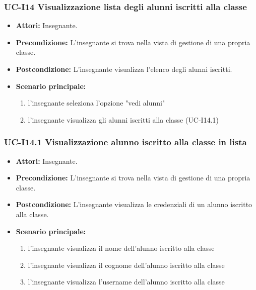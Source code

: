 \subsubsection{UC-I14 Visualizzazione lista degli alunni iscritti alla classe}		
\begin{itemize}
	\item \textbf{Attori:} Insegnante.
	\item \textbf{Precondizione:} L'insegnante si trova nella vista di gestione di una propria classe.
	\item \textbf{Postcondizione:} L'insegnante visualizza l'elenco degli alunni iscritti.
	\item \textbf{Scenario principale:}
	\begin{enumerate}
		\item l'insegnante seleziona l'opzione "vedi alunni"
		\item l'insegnante visualizza gli alunni iscritti alla classe (UC-I14.1)
			\end{enumerate}		
\end{itemize}

\subsubsection{UC-I14.1 Visualizzazione alunno iscritto alla classe in lista}		
\begin{itemize}
	\item \textbf{Attori:} Insegnante.
	\item \textbf{Precondizione:} L'insegnante si trova nella vista di gestione di una propria classe.
	\item \textbf{Postcondizione:} L'insegnante visualizza le credenziali di un alunno iscritto alla classe.
	\item \textbf{Scenario principale:}
	\begin{enumerate}
		\item l'insegnante visualizza il nome dell'alunno iscritto alla classe
		\item l'insegnante visualizza il cognome dell'alunno iscritto alla classe
		\item l'insegnante visualizza l'username dell'alunno iscritto alla classe
			\end{enumerate}		
\end{itemize}

